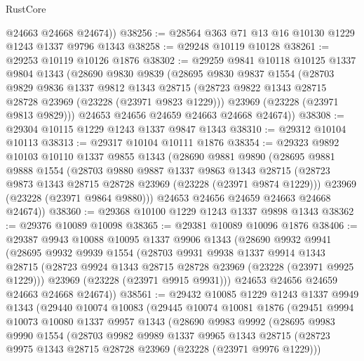 \begin{lexlean}{RustCore}
\begin{coremodule}
        @24663
        @24668
        @24674))
@38256 := @28564 @363 @71 @13 @16 @10130 @1229 @1243 @1337 @9796 @1343
@38258 := @29248 @10119 @10128
@38261 := @29253 @10119 @10126 @1876
@38302 := @29259
    @9841
    @10118
    @10125
    @1337
    @9804
    @1343
    (@28690
      @9830
      @9839
      (@28695
        @9830
        @9837
        @1554
        (@28703
          @9829
          @9836
          @1337
          @9812
          @1343
          @28715
          (@28723 @9822 @1343 @28715 @28728 @23969 (@23228 (@23971 @9823 @1229)))
          @23969
          (@23228 (@23971 @9813 @9829)))
        @24653
        @24656
        @24659
        @24663
        @24668
        @24674))
@38308 := @29304 @10115 @1229 @1243 @1337 @9847 @1343
@38310 := @29312 @10104 @10113
@38313 := @29317 @10104 @10111 @1876
@38354 := @29323
    @9892
    @10103
    @10110
    @1337
    @9855
    @1343
    (@28690
      @9881
      @9890
      (@28695
        @9881
        @9888
        @1554
        (@28703
          @9880
          @9887
          @1337
          @9863
          @1343
          @28715
          (@28723 @9873 @1343 @28715 @28728 @23969 (@23228 (@23971 @9874 @1229)))
          @23969
          (@23228 (@23971 @9864 @9880)))
        @24653
        @24656
        @24659
        @24663
        @24668
        @24674))
@38360 := @29368 @10100 @1229 @1243 @1337 @9898 @1343
@38362 := @29376 @10089 @10098
@38365 := @29381 @10089 @10096 @1876
@38406 := @29387
    @9943
    @10088
    @10095
    @1337
    @9906
    @1343
    (@28690
      @9932
      @9941
      (@28695
        @9932
        @9939
        @1554
        (@28703
          @9931
          @9938
          @1337
          @9914
          @1343
          @28715
          (@28723 @9924 @1343 @28715 @28728 @23969 (@23228 (@23971 @9925 @1229)))
          @23969
          (@23228 (@23971 @9915 @9931)))
        @24653
        @24656
        @24659
        @24663
        @24668
        @24674))
@38561 := @29432
    @10085
    @1229
    @1243
    @1337
    @9949
    @1343
    (@29440
      @10074
      @10083
      (@29445
        @10074
        @10081
        @1876
        (@29451
          @9994
          @10073
          @10080
          @1337
          @9957
          @1343
          (@28690
            @9983
            @9992
            (@28695
              @9983
              @9990
              @1554
              (@28703
                @9982
                @9989
                @1337
                @9965
                @1343
                @28715
                (@28723 @9975 @1343 @28715 @28728 @23969 (@23228 (@23971 @9976 @1229)))

\end{coremodule}
\end{lexlean}
